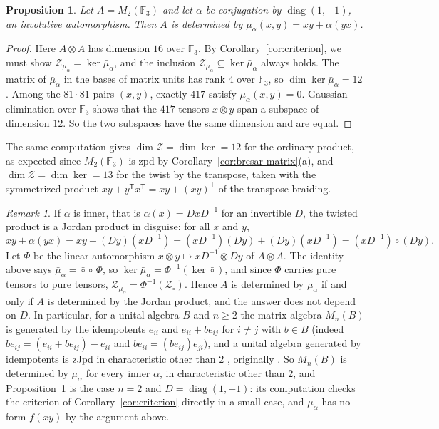 \documentclass[]{interact}
\theoremstyle{plain}
\newtheorem{proposition}[theorem]{Proposition}
\theoremstyle{definition}
\theoremstyle{remark}
\newtheorem{remark}[theorem]{Remark}
\newcommand{\Zs}{\mathcal{Z}}
\begin{document}
\begin{proposition}\label{prop:matrix}
Let $A = M_2(\mathbb{F}_3)$ and let $\alpha$ be conjugation by $\operatorname{diag}(1,-1)$, an involutive automorphism.
Then $A$ is determined by $\mu_\alpha(x,y) = xy + \alpha(yx)$.
\end{proposition}

\begin{proof}
Here $A \otimes A$ has dimension $16$ over $\mathbb{F}_3$.
By Corollary~\ref{cor:criterion}, we must show $\Zs_{\mu_\alpha} = \ker \bar\mu_\alpha$, and the inclusion $\Zs_{\mu_\alpha} \subseteq \ker \bar\mu_\alpha$ always holds.
The matrix of $\bar\mu_\alpha$ in the bases of matrix units has rank $4$ over $\mathbb{F}_3$, so $\dim \ker \bar\mu_\alpha = 12$.
Among the $81 \cdot 81$ pairs $(x,y)$, exactly $417$ satisfy $\mu_\alpha(x,y) = 0$.
Gaussian elimination over $\mathbb{F}_3$ shows that the $417$ tensors $x \otimes y$ span a subspace of dimension $12$.
So the two subspaces have the same dimension and are equal.
\end{proof}

The same computation gives $\dim \Zs = \dim \ker = 12$ for the ordinary product, as expected since $M_2(\mathbb{F}_3)$ is zpd by Corollary~\ref{cor:bresar-matrix}(a), and $\dim \Zs = \dim \ker = 13$ for the twist by the transpose, taken with the symmetrized product $xy + y^{\mathsf T} x^{\mathsf T} = xy + (xy)^{\mathsf T}$ of the transpose braiding. %

\begin{remark}\label{rem:inner}
If $\alpha$ is inner, that is $\alpha(x) = DxD^{-1}$ for an invertible $D$, the twisted product is a
Jordan product in disguise: for all $x$ and $y$,
\[
xy + \alpha(yx) = xy + (Dy)(xD^{-1}) = (xD^{-1})(Dy) + (Dy)(xD^{-1}) = (xD^{-1}) \circ (Dy) .
\]
Let $\Phi$ be the linear automorphism $x \otimes y \mapsto xD^{-1} \otimes Dy$ of $A \otimes A$. The identity above
says $\bar\mu_\alpha = \bar\circ \circ\, \Phi$, so $\ker \bar\mu_\alpha = \Phi^{-1}(\ker \bar\circ)$, and
since $\Phi$ carries pure tensors to pure tensors, $\Zs_{\mu_\alpha} = \Phi^{-1}(\Zs_\circ)$. Hence $A$ is
determined by $\mu_\alpha$ if and only if $A$ is determined by the Jordan product, and the answer does not
depend on $D$.
In particular, for a unital algebra $B$ and $n \ge 2$ the matrix algebra $M_n(B)$ is generated by the idempotents $e_{ii}$ and
$e_{ii} + be_{ij}$ for $i \ne j$ with $b \in B$ (indeed $be_{ij} = (e_{ii} + be_{ij}) - e_{ii}$ and
$be_{ii} = (be_{ij})e_{ji}$), and a unital algebra generated by idempotents is zJpd in characteristic
other than $2$ \citep[Theorem 3.15]{Bresar2021}, originally \citep[Theorem 2.1]{AnLiHe2015}. So $M_n(B)$ is determined by $\mu_\alpha$ for every inner $\alpha$, in
characteristic other than $2$, and Proposition~\ref{prop:matrix} is the case $n = 2$ and
$D = \operatorname{diag}(1,-1)$: its computation checks the criterion of Corollary~\ref{cor:criterion}
directly in a small case, and $\mu_\alpha$ has no form $f(xy)$ by the argument above.
\end{remark}
\end{document}
